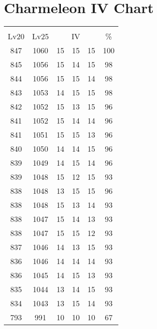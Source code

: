 \documentclass{article}%
\begin{document}
%
\normalsize%
\section{Charmeleon IV Chart}%
\label{sec:Charmeleon IV Chart}%
\renewcommand{\arraystretch}{1.5}%
\begin{tabular}{|c|c|c|c|c|c|}%
\hline%
\multicolumn{6}{|c|}{\textcolor{white}{ 
\linebreak{Charmeleon}
}%
\cellcolor{black}}\\%
\multicolumn{1}{|c}{Lv20}&\multicolumn{1}{c|}{Lv25}&\multicolumn{3}{c|}{IV}&\multicolumn{1}{|c|}{\%}\\%
\hline%
\rowcolor{color100}%
847&1060&15&15&15&100\\%
\hline%
\rowcolor{color98}%
845&1056&15&14&15&98\\%
\hline%
\rowcolor{color98}%
844&1056&15&15&14&98\\%
\hline%
\rowcolor{color98}%
843&1053&14&15&15&98\\%
\hline%
\rowcolor{color96}%
842&1052&15&13&15&96\\%
\hline%
\rowcolor{color96}%
841&1052&15&14&14&96\\%
\hline%
\rowcolor{color96}%
841&1051&15&15&13&96\\%
\hline%
\rowcolor{color96}%
840&1050&14&14&15&96\\%
\hline%
\rowcolor{color96}%
839&1049&14&15&14&96\\%
\hline%
\rowcolor{color93}%
839&1048&15&12&15&93\\%
\hline%
\rowcolor{color96}%
838&1048&13&15&15&96\\%
\hline%
\rowcolor{color93}%
838&1048&15&13&14&93\\%
\hline%
\rowcolor{color93}%
838&1047&15&14&13&93\\%
\hline%
\rowcolor{color93}%
838&1047&15&15&12&93\\%
\hline%
\rowcolor{color93}%
837&1046&14&13&15&93\\%
\hline%
\rowcolor{color93}%
836&1046&14&14&14&93\\%
\hline%
\rowcolor{color93}%
836&1045&14&15&13&93\\%
\hline%
\rowcolor{color93}%
835&1044&13&14&15&93\\%
\hline%
\rowcolor{color93}%
834&1043&13&15&14&93\\%
\hline%
\rowcolor{color91}%
793&991&10&10&10&67\\%
\end{tabular}

%
\end{document}
